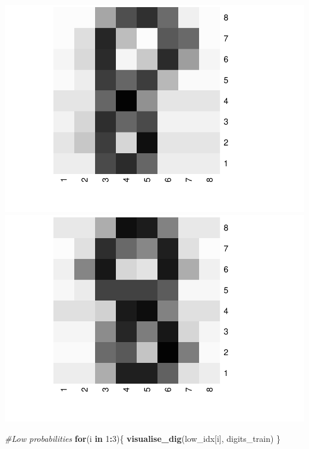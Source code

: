 \documentclass[
]{article}
\newenvironment{Shaded}{\begin{snugshade}}{\end{snugshade}}
\newcommand{\CommentTok}[1]{\textcolor[rgb]{0.56,0.35,0.01}{\textit{#1}}}
\newcommand{\ControlFlowTok}[1]{\textcolor[rgb]{0.13,0.29,0.53}{\textbf{#1}}}
\newcommand{\DecValTok}[1]{\textcolor[rgb]{0.00,0.00,0.81}{#1}}
\newcommand{\FunctionTok}[1]{\textcolor[rgb]{0.13,0.29,0.53}{\textbf{#1}}}
\newcommand{\NormalTok}[1]{#1}
\newcommand{\SpecialCharTok}[1]{\textcolor[rgb]{0.81,0.36,0.00}{\textbf{#1}}}
\begin{document}
\includegraphics{lab1_report_files/figure-latex/1.3.3-1.pdf}
\includegraphics{lab1_report_files/figure-latex/1.3.3-2.pdf}

\begin{Shaded}
\begin{Highlighting}[]
\CommentTok{\#Low probabilities}
\ControlFlowTok{for}\NormalTok{(i }\ControlFlowTok{in} \DecValTok{1}\SpecialCharTok{:}\DecValTok{3}\NormalTok{)\{}
  \FunctionTok{visualise\_dig}\NormalTok{(low\_idx[i], digits\_train)}
\NormalTok{\}}
\end{Highlighting}
\end{Shaded}
\end{document}
